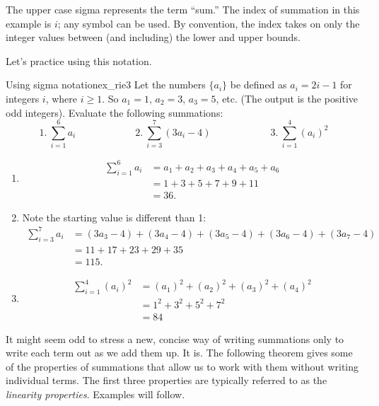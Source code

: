 The upper case sigma represents the term ``sum.'' The index of summation in this example is $i$; any symbol can be used. By convention, the index takes on only the integer values between (and including) the lower and upper bounds. 

Let's practice using this notation.\\

\begin{example}{Using sigma notation}{ex_rie3}{
Let the numbers $\{a_i\}$ be defined as $a_i = 2i-1$ for integers $i$, where $i\geq 1$. So $a_1 = 1$, $a_2 = 3$, $a_3 = 5$, etc. (The output is the positive odd integers). Evaluate the following summations:
$$ 1.\ \sum_{i=1}^6 a_i \qquad\qquad\qquad 2.\ \sum_{i=3}^7 (3a_i-4)\qquad\qquad \qquad 3.\ \sum_{i=1}^4 (a_i)^2$$
}
{\begin{enumerate}
		\item		\noindent\vskip-45pt%
						\begin{align*}
						\sum_{i=1}^6 a_i &= a_1+a_2+a_3+a_4+a_5+a_6\\
														&=	1+3+5+7+9+11 \\
														&=	36.
					\end{align*}
		\item	Note the starting value is different than 1:
					\begin{align*}
					\sum_{i=3}^7 a_i &= (3a_3-4)+(3a_4-4)+(3a_5-4)+(3a_6-4)+(3a_7-4) \\
														&= 11+17+23+29+35 \\
														&= 115.
					\end{align*}
		\item		\noindent\vskip-45pt%
						\begin{align*}
						\sum_{i=1}^4 (a_i)^2 &=	(a_1)^2+(a_2)^2+(a_3)^2+(a_4)^2\\
																&=	1^2+3^2+5^2+7^2 \\
																&=	84
						\end{align*}
\end{enumerate}	
\baselineskip											
}
\end{example}


It might seem odd to stress a new, concise way of writing summations only to write each term out as we add them up. It is. The following theorem gives some of the properties of summations that allow us to work with them without writing individual terms. The first three properties are typically referred to as the \textit{linearity properties}. Examples will follow.

